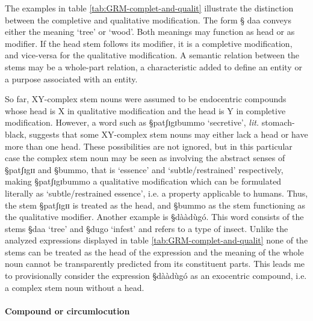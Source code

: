 The examples in table \ref{tab:GRM-complet-and-qualit} illustrate the
distinction between the completive and qualitative modification. The form {\S
daa}  conveys either the meaning `tree' or `wood'. Both meanings may function as
head or as modifier.  If the head stem follows its modifier, it is a completive
modification, and vice-versa for the qualitative modification. A semantic
relation between the stems may  be a whole-part relation, a characteristic added
to define an entity or a purpose  associated with an entity. 

So far,   XY-complex stem nouns were assumed to be  endocentric compounds whose
head is X in qualitative modification and the head is Y in completive
modification.  However, a word such as {\S patʃɪgɪbummo} `secretive', {\it lit.}
stomach-black, suggests that some XY-complex stem nouns may  either lack a head
or have more than one head. These possibilities are not ignored, but in this
particular case the complex stem noun may be seen as involving  the abstract
senses of {\S patʃɪgɪɪ} and {\S bummo}, that is  `essence' and 
`subtle/restrained' respectively, making {\S patʃɪgɪbummo} a qualitative
modification  which can be formulated literally as `subtle/restrained essence',
i.e.   a property applicable to humans. Thus, the stem {\S patʃɪgɪɪ} is treated
as the head, and {\S bummo} as the stem functioning as the qualitative modifier.
Another example is {\S dààdùgó}. This word consists of the stems {\S daa}
`tree' and  {\S dugo} `infest'   and refers to a type   of insect. Unlike the
analyzed expressions displayed in  table \ref{tab:GRM-complet-and-qualit}  none
of the stems can be treated as the head of the expression and the meaning of the
whole noun cannot be transparently  predicted from its constituent parts. This
leads me to provisionally consider the expression {\S dààdùgó}  as an
exocentric compound, i.e. a complex stem noun without a head.


 
\paragraph{Compound or circumlocution}
\label{sec:GRM-comp-vs-circum}


